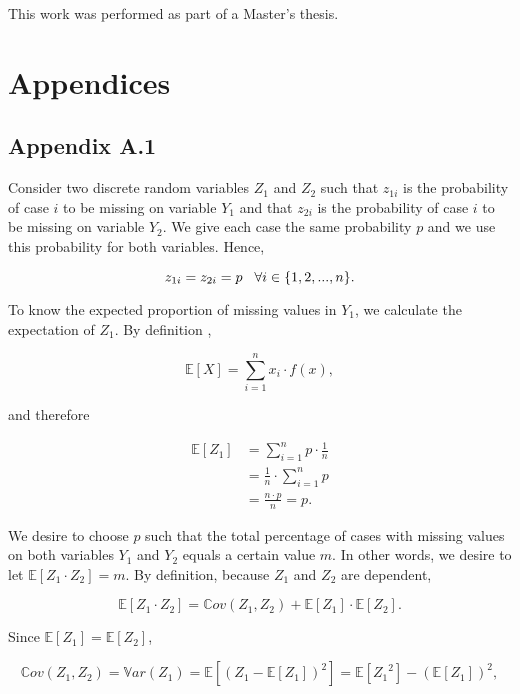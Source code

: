 \documentclass[]{interact}
\begin{document}
This work was performed as part of a Master's thesis. 




\normalsize \section*{Appendices}

\subsection*{Appendix A.1}

Consider two discrete random variables $Z_1$ and $Z_2$ such that $z_{1i}$ is the probability of case $i$ to be missing on variable $Y_1$ and that $z_{2i}$ is the probability of case $i$ to be missing on variable $Y_2$. We give each case the same probability $p$ and we use this probability for both variables. Hence, 

\[
z_{1i} = z_{2i} = p \hspace{3mm} \forall i \in \{1, 2, ..., n\}. 
\]

\noindent To know the expected proportion of missing values in $Y_1$, we calculate the expectation of $Z_1$. By definition \citep{Freund},  

\[
\mathbb{E}[X] = \sum_{i = 1}^n x_i \cdot f(x),  
\]

\noindent and therefore

\begin{align*}
\mathbb{E}[Z_1] &= \sum_{i = 1}^n p \cdot \frac{1}{n} \\
&= \frac{1}{n} \cdot \sum_{i = 1}^n p \\
&= \frac{n \cdot p}{n} = p.
\end{align*}

\noindent We desire to choose $p$ such that the total percentage of cases with missing values on both variables $Y_1$ and $Y_2$ equals a certain value $m$. In other words, we desire to let $\mathbb{E}[Z_1 \cdot Z_2] = m$. By definition, because $Z_1$ and $Z_2$ are dependent, 

\begin{equation}\label{general}
\mathbb{E}[Z_1 \cdot Z_2] = \mathbb{C}ov(Z_{1}, Z_{2}) + \mathbb{E}[Z_1] \cdot \mathbb{E}[Z_2]. 
\end{equation}

\noindent Since $\mathbb{E}[Z_1] = \mathbb{E}[Z_2]$, 

\begin{equation}\label{cov}
\mathbb{C}ov(Z_{1}, Z_{2}) = \mathbb{V}ar(Z_1) = \mathbb{E}[(Z_1 - \mathbb{E}[Z_1])^2] = \mathbb{E}[{Z_1}^2] - {(\mathbb{E}[Z_1])}^2,
\end{equation}
\end{document}
